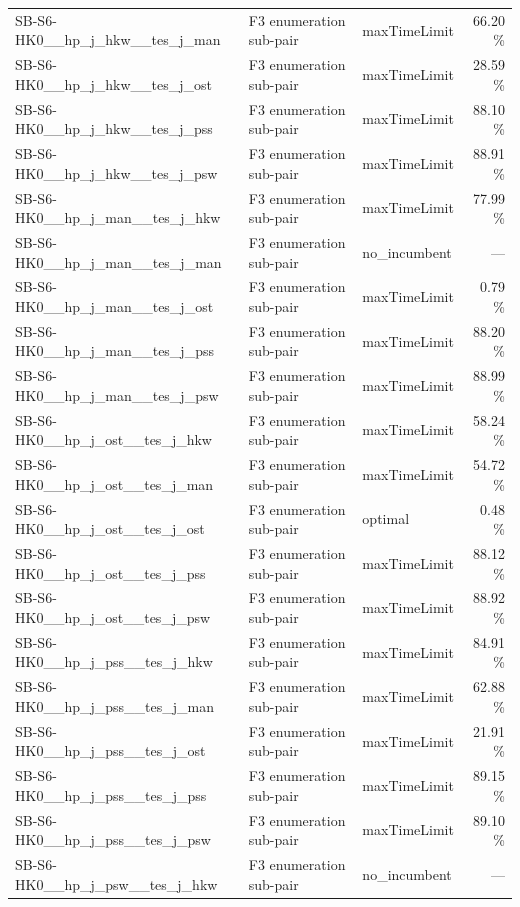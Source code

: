\begin{table}[htbp]
\begin{tabular}{lllr}
  SB-S6-HK0\_\_hp\_j\_hkw\_\_tes\_j\_man & F3 enumeration sub-pair & maxTimeLimit & 66.20 \% \\
  SB-S6-HK0\_\_hp\_j\_hkw\_\_tes\_j\_ost & F3 enumeration sub-pair & maxTimeLimit & 28.59 \% \\
  SB-S6-HK0\_\_hp\_j\_hkw\_\_tes\_j\_pss & F3 enumeration sub-pair & maxTimeLimit & 88.10 \% \\
  SB-S6-HK0\_\_hp\_j\_hkw\_\_tes\_j\_psw & F3 enumeration sub-pair & maxTimeLimit & 88.91 \% \\
  SB-S6-HK0\_\_hp\_j\_man\_\_tes\_j\_hkw & F3 enumeration sub-pair & maxTimeLimit & 77.99 \% \\
  SB-S6-HK0\_\_hp\_j\_man\_\_tes\_j\_man & F3 enumeration sub-pair & no\_incumbent & — \\
  SB-S6-HK0\_\_hp\_j\_man\_\_tes\_j\_ost & F3 enumeration sub-pair & maxTimeLimit & 0.79 \% \\
  SB-S6-HK0\_\_hp\_j\_man\_\_tes\_j\_pss & F3 enumeration sub-pair & maxTimeLimit & 88.20 \% \\
  SB-S6-HK0\_\_hp\_j\_man\_\_tes\_j\_psw & F3 enumeration sub-pair & maxTimeLimit & 88.99 \% \\
  SB-S6-HK0\_\_hp\_j\_ost\_\_tes\_j\_hkw & F3 enumeration sub-pair & maxTimeLimit & 58.24 \% \\
  SB-S6-HK0\_\_hp\_j\_ost\_\_tes\_j\_man & F3 enumeration sub-pair & maxTimeLimit & 54.72 \% \\
  SB-S6-HK0\_\_hp\_j\_ost\_\_tes\_j\_ost & F3 enumeration sub-pair & optimal & 0.48 \% \\
  SB-S6-HK0\_\_hp\_j\_ost\_\_tes\_j\_pss & F3 enumeration sub-pair & maxTimeLimit & 88.12 \% \\
  SB-S6-HK0\_\_hp\_j\_ost\_\_tes\_j\_psw & F3 enumeration sub-pair & maxTimeLimit & 88.92 \% \\
  SB-S6-HK0\_\_hp\_j\_pss\_\_tes\_j\_hkw & F3 enumeration sub-pair & maxTimeLimit & 84.91 \% \\
  SB-S6-HK0\_\_hp\_j\_pss\_\_tes\_j\_man & F3 enumeration sub-pair & maxTimeLimit & 62.88 \% \\
  SB-S6-HK0\_\_hp\_j\_pss\_\_tes\_j\_ost & F3 enumeration sub-pair & maxTimeLimit & 21.91 \% \\
  SB-S6-HK0\_\_hp\_j\_pss\_\_tes\_j\_pss & F3 enumeration sub-pair & maxTimeLimit & 89.15 \% \\
  SB-S6-HK0\_\_hp\_j\_pss\_\_tes\_j\_psw & F3 enumeration sub-pair & maxTimeLimit & 89.10 \% \\
  SB-S6-HK0\_\_hp\_j\_psw\_\_tes\_j\_hkw & F3 enumeration sub-pair & no\_incumbent & — \\

\end{tabular}
\end{table}
